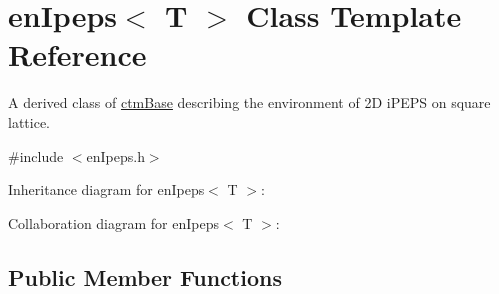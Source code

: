 \hypertarget{classenIpeps}{}\section{en\+Ipeps$<$ T $>$ Class Template Reference}
\label{classenIpeps}


A derived class of \hyperlink{classctmBase}{ctm\+Base} describing the environment of 2D i\+P\+E\+PS on square lattice.  




{\ttfamily \#include $<$en\+Ipeps.\+h$>$}



Inheritance diagram for en\+Ipeps$<$ T $>$\+:


Collaboration diagram for en\+Ipeps$<$ T $>$\+:
\subsection*{Public Member Functions}
